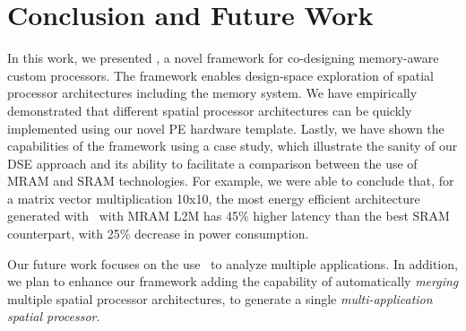 \section{Conclusion and Future Work}
In this work, we presented \frameworkname, a novel framework for co-designing memory-aware custom processors.
The framework enables design-space exploration of spatial processor architectures including the memory system. We have empirically demonstrated that different spatial processor architectures can be quickly implemented using our novel PE hardware template. Lastly, we have shown the capabilities of the framework using a case study, which illustrate the sanity of our DSE approach and its ability to facilitate a comparison between the use of MRAM and SRAM technologies.
For example, we were able to conclude that, for a matrix vector multiplication 10x10, the most energy efficient architecture generated with \frameworkname~with MRAM L2M has 45\% higher latency than the best SRAM counterpart, with 25\% decrease in power consumption.

Our future work focuses on the use \frameworkname~to analyze multiple applications. In addition, we plan to enhance our framework adding the capability of automatically \textit{merging} multiple spatial processor architectures, to generate a single \textit{multi-application spatial processor}.
